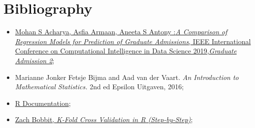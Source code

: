 \documentclass[12pt]{article}
\begin{document}
\section{Bibliography}
\label{b}
\begin{itemize}
    \item \href{https://www.kaggle.com/datasets/mohansacharya/graduate-admissions}{Mohan S Acharya, Asfia Armaan, Aneeta S Antony :\textit{A Comparison of Regression Models for Prediction of Graduate Admissions}, IEEE International Conference on Computational Intelligence in Data Science 2019,\textit{Graduate Admission 2}};
    \item Marianne Jonker Fetsje Bijma and Aad van der Vaart. \textit{An Introduction to Mathematical Statistics.} 2nd ed Epsilon Uitgaven, 2016;
    \item 
    \href{https://www.rdocumentation.org/}{R Documentation};    
    \item 
    \href{https://www.statology.org/k-fold-cross-validation-in-r/}
    {Zach Bobbit, \textit{K-Fold Cross Validation in R (Step-by-Step)}};
\end{itemize}
\end{document}

